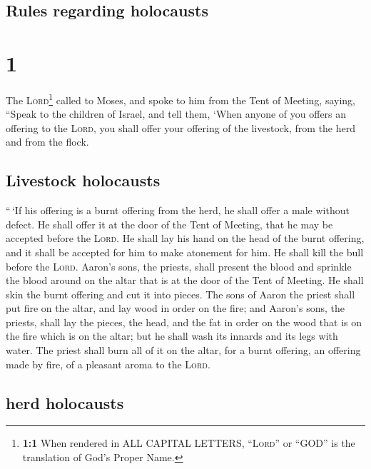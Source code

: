 \hypertarget{rules-regarding-holocausts}{%
\subsection{Rules regarding
holocausts}\label{rules-regarding-holocausts}}

\hypertarget{section}{%
\section{1}\label{section}}

 The \textsc{Lord}\footnote{\textbf{1:1} When rendered in
  ALL CAPITAL LETTERS, ``\textsc{Lord}'' or ``GOD'' is the translation
  of God's Proper Name.} called to Moses, and spoke to him from the Tent
of Meeting, saying,  ``Speak to the children of Israel,
and tell them, `When anyone of you offers an offering to the
\textsc{Lord}, you shall offer your offering of the livestock, from the
herd and from the flock.

\hypertarget{livestock-holocausts}{%
\subsection{Livestock holocausts}\label{livestock-holocausts}}

 ``\,`If his offering is a burnt offering from the herd,
he shall offer a male without defect. He shall offer it at the door of
the Tent of Meeting, that he may be accepted before the \textsc{Lord}.
 He shall lay his hand on the head of the burnt offering,
and it shall be accepted for him to make atonement for him.
 He shall kill the bull before the \textsc{Lord}. Aaron's
sons, the priests, shall present the blood and sprinkle the blood around
on the altar that is at the door of the Tent of Meeting. 
He shall skin the burnt offering and cut it into pieces. 
The sons of Aaron the priest shall put fire on the altar, and lay wood
in order on the fire;  and Aaron's sons, the priests,
shall lay the pieces, the head, and the fat in order on the wood that is
on the fire which is on the altar;  but he shall wash its
innards and its legs with water. The priest shall burn all of it on the
altar, for a burnt offering, an offering made by fire, of a pleasant
aroma to the \textsc{Lord}.

\hypertarget{herd-holocausts}{%
\subsection{herd holocausts}\label{herd-holocausts}}

